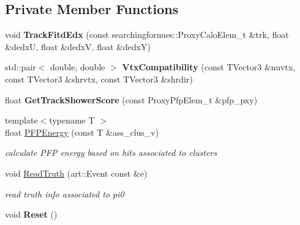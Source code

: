\subsection*{Private Member Functions}
\begin{DoxyCompactItemize}
\item 
void {\bfseries Track\+Fitd\+Edx} (const searchingfornues\+::\+Proxy\+Calo\+Elem\+\_\+t \&trk, float \&dedxU, float \&dedxV, float \&dedxY)\hypertarget{classselection_1_1Pi0Selection_ae4c04e3355249e513c5096cc8381317c}{}\label{classselection_1_1Pi0Selection_ae4c04e3355249e513c5096cc8381317c}

\item 
std\+::pair$<$ double, double $>$ {\bfseries Vtx\+Compatibility} (const T\+Vector3 \&nuvtx, const T\+Vector3 \&shrvtx, const T\+Vector3 \&shrdir)\hypertarget{classselection_1_1Pi0Selection_ad5dca90018e57209bfb37d07cfb352eb}{}\label{classselection_1_1Pi0Selection_ad5dca90018e57209bfb37d07cfb352eb}

\item 
float {\bfseries Get\+Track\+Shower\+Score} (const Proxy\+Pfp\+Elem\+\_\+t \&pfp\+\_\+pxy)\hypertarget{classselection_1_1Pi0Selection_a4605f0795f90e5bab0053b9798b53527}{}\label{classselection_1_1Pi0Selection_a4605f0795f90e5bab0053b9798b53527}

\item 
{\footnotesize template$<$typename T $>$ }\\float \hyperlink{classselection_1_1Pi0Selection_ada49763ed62a370288aa41eb67eb2c81}{P\+F\+P\+Energy} (const T \&ass\+\_\+clus\+\_\+v)\hypertarget{classselection_1_1Pi0Selection_ada49763ed62a370288aa41eb67eb2c81}{}\label{classselection_1_1Pi0Selection_ada49763ed62a370288aa41eb67eb2c81}

\begin{DoxyCompactList}\small\item\em calculate P\+FP energy based on hits associated to clusters \end{DoxyCompactList}\item 
void \hyperlink{classselection_1_1Pi0Selection_aa56e851c27c26dd695a9a831ed693401}{Read\+Truth} (art\+::\+Event const \&e)\hypertarget{classselection_1_1Pi0Selection_aa56e851c27c26dd695a9a831ed693401}{}\label{classselection_1_1Pi0Selection_aa56e851c27c26dd695a9a831ed693401}

\begin{DoxyCompactList}\small\item\em read truth info associated to pi0 \end{DoxyCompactList}\item 
void {\bfseries Reset} ()\hypertarget{classselection_1_1Pi0Selection_a32a8080624253e6d72b7d55526d50a42}{}\label{classselection_1_1Pi0Selection_a32a8080624253e6d72b7d55526d50a42}

\end{DoxyCompactItemize}
